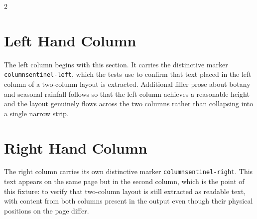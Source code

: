 \documentclass{article}
\begin{document}
\begin{multicols}{2}

\section{Left Hand Column}
The left column begins with this section. It carries the distinctive marker
\texttt{columnsentinel-left}, which the tests use to confirm that text placed
in the left column of a two-column layout is extracted. Additional filler
prose about botany and seasonal rainfall follows so that the left column
achieves a reasonable height and the layout genuinely flows across the two
columns rather than collapsing into a single narrow strip.

\section{Right Hand Column}
The right column carries its own distinctive marker
\texttt{columnsentinel-right}. This text appears on the same page but in the
second column, which is the point of this fixture: to verify that two-column
layout is still extracted as readable text, with content from both columns
present in the output even though their physical positions on the page differ.

\end{multicols}
\end{document}
